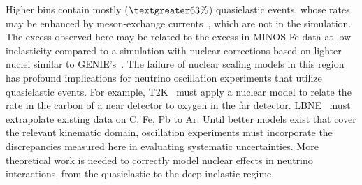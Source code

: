 Higher \Xbj bins contain mostly ($\textgreater63\%$) quasielastic events, 
whose rates may be enhanced by meson-exchange currents~\cite{Carlson:2001mp,PhysRevC.80.065501,PhysRevC.81.045502,Bodek:2011ps,Amaro2011151,PhysRevC.83.045501,PhysRevD.88.113007},
which are not in the simulation.
The excess observed here may be related to the excess in MINOS Fe data at low inelasticity compared to a simulation with nuclear corrections based on lighter nuclei similar to GENIE's~\cite{PhysRevD.77.072002,arxiv:0708.1495}.
The failure of nuclear scaling models in this region has profound implications for neutrino oscillation experiments that utilize quasielastic events.
For example, T2K~\cite{PhysRevLett.111.211803,PhysRevLett.112.061802} must apply a nuclear model to relate the rate in the carbon of a near detector to oxygen in the far detector.  
LBNE~\cite{lbne_new} must extrapolate existing data on C, Fe, Pb to Ar.
Until better models exist that cover the relevant kinematic domain, oscillation experiments must 
incorporate the discrepancies measured here in evaluating systematic uncertainties.
More theoretical work is needed to correctly model nuclear effects in neutrino interactions, from the quasielastic to the deep inelastic regime.

